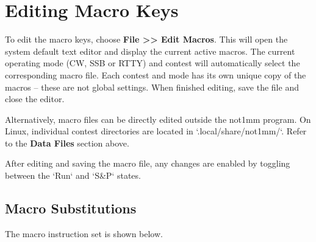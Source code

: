 \documentclass{article}
\begin{document}
\section{Editing Macro Keys}
To edit the macro keys, choose \textbf{File >> Edit Macros}. This will open the system default text editor and display the current active macros.   The current operating mode (CW, SSB or RTTY) and contest will automatically select the corresponding macro file. Each contest and mode has its own unique copy of the macros -- these are not global settings. When finished editing, save the file and close the editor.

Alternatively, macro files can be directly edited outside the not1mm program. On Linux, individual contest directories are located in `.local/share/not1mm/`. Refer to the \textbf{Data Files} section above.

After editing and saving the macro file, any changes are enabled by toggling between the `Run` and `S\&P` states.


\subsection{Macro Substitutions}

The macro instruction set is shown below.
\end{document}
